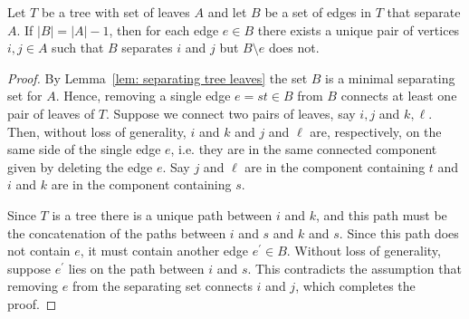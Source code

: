 \begin{lemm}
    \label{lem: unique pair}
    Let $T$ be a tree with set of leaves $A$ and let $B$ be a set of edges in $T$ that separate $A$.  If $|B| = |A|-1$, then for each edge $e\in B$ there exists a unique pair of vertices $i,j\in A$ such that $B$ separates $i$ and $j$ but $B\setminus e$ does not. 
\end{lemm}

\begin{proof}
By Lemma~\ref{lem: separating tree leaves} the set $B$ is a minimal separating set for $A$. 
Hence, removing a single edge $e = st\in B$ from $B$ connects at least one pair of leaves of $T$. 
Suppose we connect two pairs of leaves, say $i,j$ and $k, \ell$. 
Then, without loss of generality, $i$ and $k$ and $j$ and $\ell$ are, respectively, on the same side of the single edge $e$, i.e. they are in the same connected component given by deleting the edge $e$. 
Say $j$ and $\ell$ are in the component containing $t$ and $i$ and $k$ are in the component containing $s$. 

Since $T$ is a tree there is a unique path between $i$ and $k$, and this path must be the concatenation of the paths between $i$ and $s$ and $k$ and $s$.  
Since this path does not contain $e$, it must contain another edge $e^\prime\in B$. 
Without loss of generality, suppose $e^\prime$ lies on the path between $i$ and $s$. 
This contradicts the assumption that removing $e$ from the separating set connects $i$ and $j$, which completes the proof. 
\end{proof}

